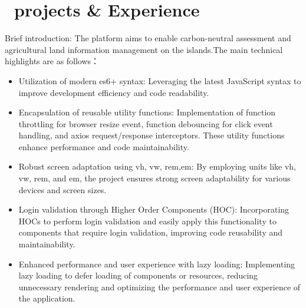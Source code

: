 \documentclass{resume}
\begin{document}
\section{\faUsers\ projects \& Experience}
Brief introduction: The platform aims to enable carbon-neutral assessment and agricultural land information management on the islands.The main technical highlights are as follows：
\begin{itemize}
  \item Utilization of modern es6+ syntax: Leveraging the latest JavaScript syntax to improve development efficiency and code readability.
  \item Encapsulation of reusable utility functions: Implementation of function throttling for browser resize event, function debouncing for click event handling, and axios request/response interceptors. These utility functions enhance performance and code maintainability.
  \item Robust screen adaptation using vh, vw, rem,em: By employing units like vh, vw, rem, and em, the project ensures strong screen adaptability for various devices and screen sizes.
  \item Login validation through Higher Order Components (HOC): Incorporating HOCs to perform login validation and easily apply this functionality to components that require login validation, improving code reusability and maintainability.
  \item Enhanced performance and user experience with lazy loading: Implementing lazy loading to defer loading of components or resources, reducing unnecessary rendering and optimizing the performance and user experience of the application.
\end{itemize}


\end{document}
